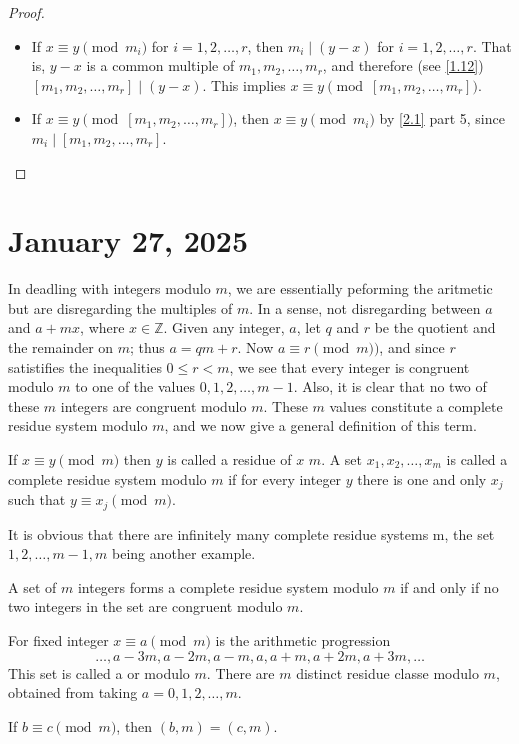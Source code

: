 \documentclass[11pt]{article}
\begin{document}
\begin{proof}
	\begin{itemize}
		\item If \(x \equiv y \pmod{m_i}\) for \(i = 1, 2, \ldots, r\), then \(m_i \mid (y -
		      x)\) for \(i = 1, 2, \ldots, r\). That is, \(y - x\) is a common multiple of
		      \(m_1, m_2, \ldots, m_r\), and therefore (see \cref{1.12}) \([m_1, m_2, \ldots,
				      m_r] \mid (y - x)\). This implies \(x \equiv y \pmod{[m_1, m_2, \ldots,
					      m_r]}\).
		\item If \(x \equiv y \pmod{[m_1, m_2, \ldots, m_r]}\), then \(x \equiv y
		      \pmod{m_i}\) by \cref{2.1} part 5, since \(m_i \mid [m_1, m_2, \ldots, m_r]\).
	\end{itemize}
\end{proof}
\section{January 27, 2025}
In deadling with integers modulo \(m\), we are essentially peforming the
aritmetic but are disregarding the multiples of \(m\). In a sense, not
disregarding between \(a\) and \(a + mx\), where \(x \in \mathbb{Z}\). Given
any integer, \(a\), let \(q\) and \(r\) be the quotient and the remainder on
\(m\); thus \(a = qm + r\). Now \(a \equiv r \pmod{m})\), and since \(r\)
satistifies the inequalities \(0 \leqslant r < m\), we see that every integer
is congruent modulo \(m\) to one of the values \(0, 1, 2, \ldots, m - 1\).
Also, it is clear that no two of these \(m\) integers are congruent modulo
\(m\). These \(m\) values constitute a complete residue system modulo \(m\),
and we now give a general definition of this term.

\begin{definition}
	If \(x \equiv y \pmod {m}\) then \(y\) is called a residue of \(x\)  \(m\). A set \(x_1, x_2, \ldots, x_m\) is called a complete residue system modulo \(m\) if for every integer \(y\) there is one and only \(x_j\) such that \(y \equiv x_j\pmod {m}\).
\end{definition}

It is obvious that there are infinitely many complete residue systems
 m, the set \(1, 2, \ldots, m - 1, m\) being another example.

A set of \(m\) integers forms a complete residue system modulo \(m\) if and
only if no two integers in the set are congruent modulo \(m\).

For fixed integer \(x \equiv a \pmod {m}\) is the arithmetic progression
\[
	\ldots, a - 3m, a - 2m, a - m, a, a + m, a + 2m, a + 3m, \ldots
\]
This set is called a  or  modulo
\(m\). There are \(m\) distinct residue classe modulo \(m\), obtained from
taking \(a = 0, 1, 2, \ldots, m \).
\begin{theorem}\label{2.4}
	If \(b \equiv c \pmod{m}\), then \((b, m) = (c, m)\).
\end{theorem}
\end{document}
